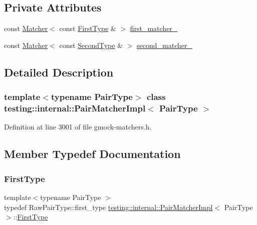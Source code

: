 \subsection*{Private Attributes}
\begin{DoxyCompactItemize}
\item 
const \hyperlink{classtesting_1_1Matcher}{Matcher}$<$ const \hyperlink{classtesting_1_1internal_1_1PairMatcherImpl_a9de66d76f0ebb0f107a9c18903b03176}{First\+Type} \& $>$ \hyperlink{classtesting_1_1internal_1_1PairMatcherImpl_a70e5a952ffd16886f5f1bacc718561f8}{first\+\_\+matcher\+\_\+}
\item 
const \hyperlink{classtesting_1_1Matcher}{Matcher}$<$ const \hyperlink{classtesting_1_1internal_1_1PairMatcherImpl_ad63c9ff4f1aff81562efca293ff5aca9}{Second\+Type} \& $>$ \hyperlink{classtesting_1_1internal_1_1PairMatcherImpl_a2341ad72afa02dcadb98c531cada3576}{second\+\_\+matcher\+\_\+}
\end{DoxyCompactItemize}


\subsection{Detailed Description}
\subsubsection*{template$<$typename Pair\+Type$>$\newline
class testing\+::internal\+::\+Pair\+Matcher\+Impl$<$ Pair\+Type $>$}



Definition at line 3001 of file gmock-\/matchers.\+h.



\subsection{Member Typedef Documentation}
\mbox{\label{classtesting_1_1internal_1_1PairMatcherImpl_a9de66d76f0ebb0f107a9c18903b03176}} 
\subsubsection{\texorpdfstring{First\+Type}{FirstType}}
{\footnotesize\ttfamily template$<$typename Pair\+Type $>$ \\
typedef Raw\+Pair\+Type\+::first\+\_\+type \hyperlink{classtesting_1_1internal_1_1PairMatcherImpl}{testing\+::internal\+::\+Pair\+Matcher\+Impl}$<$ Pair\+Type $>$\+::\hyperlink{classtesting_1_1internal_1_1PairMatcherImpl_a9de66d76f0ebb0f107a9c18903b03176}{First\+Type}}



